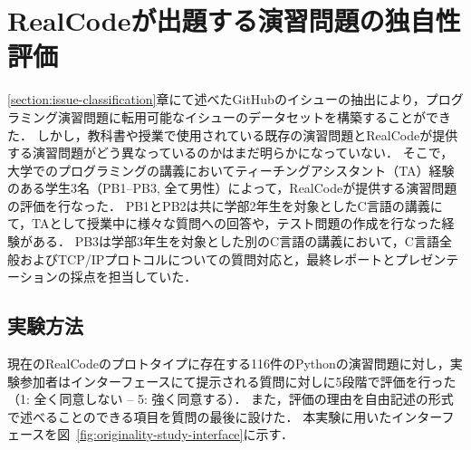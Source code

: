 \chapter{RealCodeが出題する演習問題の独自性評価}
\graphicspath{{Chapters_evaluation/Figs/}}
\label{section:ta_evaluation}


\ref{section:issue-classification}章にて述べたGitHubのイシューの抽出により，プログラミング演習問題に転用可能なイシューのデータセットを構築することができた．
しかし，教科書や授業で使用されている既存の演習問題とRealCodeが提供する演習問題がどう異なっているのかはまだ明らかになっていない．
そこで，大学でのプログラミングの講義においてティーチングアシスタント（TA）経験のある学生3名（PB1--PB3, 全て男性）によって，RealCodeが提供する演習問題の評価を行なった．
PB1とPB2は共に学部2年生を対象としたC言語の講義にて，TAとして授業中に様々な質問への回答や，テスト問題の作成を行なった経験がある．
PB3は学部3年生を対象とした別のC言語の講義において，C言語全般およびTCP/IPプロトコルについての質問対応と，最終レポートとプレゼンテーションの採点を担当していた．


\section{実験方法}
現在のRealCodeのプロトタイプに存在する116件のPythonの演習問題に対し，実験参加者はインターフェースにて提示される質問に対しに5段階で評価を行った（1: 全く同意しない -- 5: 強く同意する）．
また，評価の理由を自由記述の形式で述べることのできる項目を質問の最後に設けた．
本実験に用いたインターフェースを図~\ref{fig:originality-study-interface}に示す．

